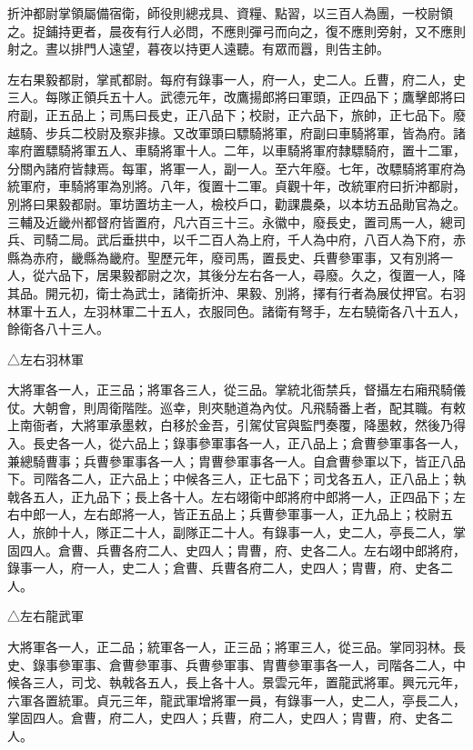 \begin{pinyinscope}
 折沖都尉掌領屬備宿衛，師役則總戎具、資糧、點習，以三百人為團，一校尉領之。捉鋪持更者，晨夜有行人必問，不應則彈弓而向之，復不應則旁射，又不應則射之。晝以排門人遠望，暮夜以持更人遠聽。有眾而囂，則告主帥。



 左右果毅都尉，掌貳都尉。每府有錄事一人，府一人，史二人。丘曹，府二人，史三人。每隊正領兵五十人。武德元年，改鷹揚郎將曰軍頭，正四品下；鷹擊郎將曰府副，正五品上；司馬曰長史，正八品下；校尉，正六品下，旅帥，正七品下。廢越騎、步兵二校尉及察非掾。又改軍頭曰驃騎將軍，府副曰車騎將軍，皆為府。諸率府置驃騎將軍五人、車騎將軍十人。二年，以車騎將軍府隸驃騎府，置十二軍，分關內諸府皆隸焉。每軍，將軍一人，副一人。至六年廢。七年，改驃騎將軍府為統軍府，車騎將軍為別將。八年，復置十二軍。貞觀十年，改統軍府曰折沖都尉，別將曰果毅都尉。軍坊置坊主一人，檢校戶口，勸課農桑，以本坊五品勛官為之。三輔及近畿州都督府皆置府，凡六百三十三。永徽中，廢長史，置司馬一人，總司兵、司騎二局。武后垂拱中，以千二百人為上府，千人為中府，八百人為下府，赤縣為赤府，畿縣為畿府。聖歷元年，廢司馬，置長史、兵曹參軍事，又有別將一人，從六品下，居果毅都尉之次，其後分左右各一人，尋廢。久之，復置一人，降其品。開元初，衛士為武士，諸衛折沖、果毅、別將，擇有行者為展仗押官。右羽林軍十五人，左羽林軍二十五人，衣服同色。諸衛有弩手，左右驍衛各八十五人，餘衛各八十三人。



 △左右羽林軍



 大將軍各一人，正三品；將軍各三人，從三品。掌統北衙禁兵，督攝左右廂飛騎儀仗。大朝會，則周衛階陛。巡幸，則夾馳道為內仗。凡飛騎番上者，配其職。有敕上南衙者，大將軍承墨敕，白移於金吾，引駕仗官與監門奏覆，降墨敕，然後乃得入。長史各一人，從六品上；錄事參軍事各一人，正八品上；倉曹參軍事各一人，兼總騎曹事；兵曹參軍事各一人；胄曹參軍事各一人。自倉曹參軍以下，皆正八品下。司階各二人，正六品上；中候各三人，正七品下；司戈各五人，正八品上；執戟各五人，正九品下；長上各十人。左右翊衛中郎將府中郎將一人，正四品下；左右中郎一人，左右郎將一人，皆正五品上；兵曹參軍事一人，正九品上；校尉五人，旅帥十人，隊正二十人，副隊正二十人。有錄事一人，史二人，亭長二人，掌固四人。倉曹、兵曹各府二人、史四人；胄曹，府、史各二人。左右翊中郎將府，錄事一人，府一人，史二人；倉曹、兵曹各府二人，史四人；胄曹，府、史各二人。



 △左右龍武軍



 大將軍各一人，正二品；統軍各一人，正三品；將軍三人，從三品。掌同羽林。長史、錄事參軍事、倉曹參軍事、兵曹參軍事、胄曹參軍事各一人，司階各二人，中候各三人，司戈、執戟各五人，長上各十人。景雲元年，置龍武將軍。興元元年，六軍各置統軍。貞元三年，龍武軍增將軍一員，有錄事一人，史二人，亭長二人，掌固四人。倉曹，府二人，史四人；兵曹，府二人，史四人；胄曹，府、史各二人。




\end{pinyinscope}
